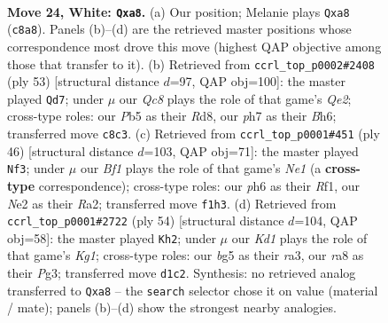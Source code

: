 \documentclass[11pt]{article}
\begin{document}
\clearpage

\begin{figure}[p]\centering
\begin{subfigure}{0.46\textwidth}\centering
\resizebox{\linewidth}{!}{%
\newchessgame
\chessboard[
  setfen={r1Q5/pp1n2kp/7p/1P1q2b1/3P2P1/4rP2/4N3/R2K1B1R w - - 2 24},
  showmover=false,
  pgfstyle=straightmove, color=movearrow, markmove={c8-a8}
]}
\caption{}
\end{subfigure}\hfill
\begin{subfigure}{0.46\textwidth}\centering
\resizebox{\linewidth}{!}{%
\newchessgame
\chessboard[
  setfen={1k1r4/1p2q3/1Qp4b/4Rb1p/2P2p2/P4N1P/1P4P1/2KB4 b - - 0 27},
  showmover=false,
  pgfstyle=straightmove, color=movearrow, markmove={e7-d7}
]}
\caption{}
\end{subfigure}
\\[4pt]
\begin{subfigure}{0.46\textwidth}\centering
\resizebox{\linewidth}{!}{%
\newchessgame
\chessboard[
  setfen={4r1k1/pQp2pp1/2nr4/P6b/8/2PPq2P/R3P1B1/4NR1K w - - 0 24},
  showmover=false,
  pgfstyle=straightmove, color=movearrow, markmove={e1-f3}
]}
\caption{}
\end{subfigure}\hfill
\begin{subfigure}{0.46\textwidth}\centering
\resizebox{\linewidth}{!}{%
\newchessgame
\chessboard[
  setfen={6k1/1r1n1pp1/3Q4/2p5/3pqN1P/r5P1/4PP2/2RR2K1 w - - 0 28},
  showmover=false,
  pgfstyle=straightmove, color=movearrow, markmove={g1-h2}
]}
\caption{}
\end{subfigure}
\caption{\textbf{Move 24, White: \texttt{Qxa8}.} (a) Our position; Melanie plays \texttt{Qxa8} (\texttt{c8a8}). Panels (b)--(d) are the retrieved master positions whose correspondence most drove this move (highest QAP objective among those that transfer to it). (b) Retrieved from \texttt{ccrl\_top\_p0002\#2408} (ply 53) [structural distance $d$=97, QAP obj=100]: the master played \texttt{Qd7}; under $\mu$ our \emph{Qc8} plays the role of that game's \emph{Qe2}; cross-type roles: our \emph{P}b5 as their \emph{R}d8, our \emph{p}h7 as their \emph{B}h6; transferred move \texttt{c8c3}. (c) Retrieved from \texttt{ccrl\_top\_p0001\#451} (ply 46) [structural distance $d$=103, QAP obj=71]: the master played \texttt{Nf3}; under $\mu$ our \emph{Bf1} plays the role of that game's \emph{Ne1} (a \textbf{cross-type} correspondence); cross-type roles: our \emph{p}h6 as their \emph{R}f1, our \emph{N}e2 as their \emph{R}a2; transferred move \texttt{f1h3}. (d) Retrieved from \texttt{ccrl\_top\_p0001\#2722} (ply 54) [structural distance $d$=104, QAP obj=58]: the master played \texttt{Kh2}; under $\mu$ our \emph{Kd1} plays the role of that game's \emph{Kg1}; cross-type roles: our \emph{b}g5 as their \emph{r}a3, our \emph{r}a8 as their \emph{P}g3; transferred move \texttt{d1c2}. Synthesis: no retrieved analog transferred to \texttt{Qxa8} -- the \texttt{search} selector chose it on value (material / mate); panels (b)--(d) show the strongest nearby analogies.}
\label{fig:thought-m46}
\end{figure}
\end{document}
